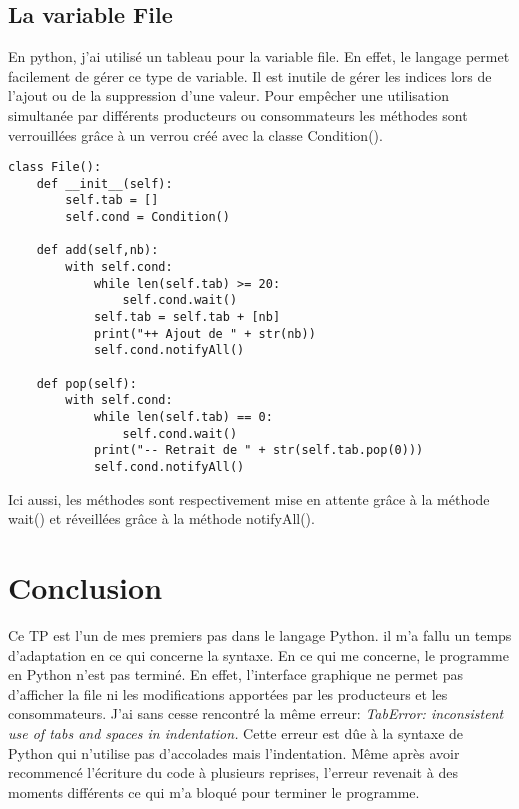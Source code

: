 \documentclass{article}
\begin{document}
\subsection{La variable File}

En python, j'ai utilisé un tableau pour la variable file. En effet, le langage permet facilement de gérer ce type de variable. Il est inutile de gérer les indices lors de l'ajout ou de la suppression d'une valeur. Pour empêcher une utilisation simultanée par différents producteurs ou consommateurs les méthodes sont verrouillées grâce à un verrou créé avec la classe Condition().

\begin{verbatim}
class File():
    def __init__(self):
        self.tab = []
        self.cond = Condition()

    def add(self,nb):
        with self.cond:
            while len(self.tab) >= 20:
                self.cond.wait()
            self.tab = self.tab + [nb]
            print("++ Ajout de " + str(nb))
            self.cond.notifyAll()

    def pop(self):
        with self.cond:
            while len(self.tab) == 0:
                self.cond.wait()
            print("-- Retrait de " + str(self.tab.pop(0)))
            self.cond.notifyAll()
\end{verbatim}

Ici aussi, les méthodes sont respectivement mise en attente grâce à la méthode wait() et réveillées grâce à la méthode notifyAll().

\section{Conclusion}

Ce TP est l'un de mes premiers pas dans le langage Python. il m'a fallu un temps d'adaptation en ce qui concerne la syntaxe.
En ce qui me concerne, le programme en Python n'est pas terminé. En effet, l'interface graphique ne permet pas d'afficher la file ni les modifications apportées par les producteurs et les consommateurs.
J'ai sans cesse rencontré la même erreur: \textit{TabError: inconsistent use of tabs and spaces in indentation.}
Cette erreur est dûe à la syntaxe de Python qui n'utilise pas d'accolades mais l'indentation. Même après avoir recommencé l'écriture du code à plusieurs reprises, l'erreur revenait à des moments différents ce qui m'a bloqué pour terminer le programme.




\end{document}
